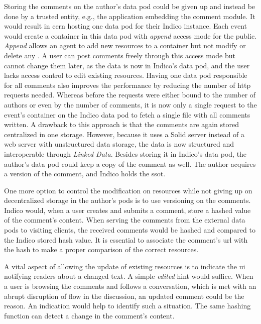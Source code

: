 Storing the comments on the author's data pod could be given up and instead be done by a trusted entity, e.g., the application embedding the comment module. It would result in \gls{cern} hosting one data pod for their Indico instance. Each event would create a container in this data pod with \textit{append} access mode for the public. \textit{Append} allows an agent to add new resources to a container but not modify or delete any \cite{solid-protocol}. A user can post comments freely through this access mode but cannot change them later, as the data is now in Indico's data pod, and the user lacks access control to edit existing resources. Having one data pod responsible for all comments also improves the performance by reducing the number of \gls{http} requests needed. Whereas before the requests were either bound to the number of authors or even by the number of comments, it is now only a single request to the event's container on the Indico data pod to fetch a single file with all comments written. A drawback to this approach is that the comments are again stored centralized in one storage. However, because it uses a Solid server instead of a web server with unstructured data storage, the data is now structured and interoperable through \textit{Linked Data}. Besides storing it in Indico's data pod, the author's data pod could keep a copy of the comment as well. The author acquires a version of the comment, and Indico holds the \gls{ssot}.

One more option to control the modification on resources while not giving up on decentralized storage in the author's pods is to use versioning on the comments. Indico would, when a user creates and submits a comment, store a hashed value of the comment's content. When serving the comments from the external data pods to visiting clients, the received comments would be hashed and compared to the Indico stored hash value. It is essential to associate the comment's \gls{url} with the hash to make a proper comparison of the correct resources.

A vital aspect of allowing the update of existing resources is to indicate the \gls{ui} notifying readers about a changed text. A simple \textit{edited} hint would suffice. When a user is browsing the comments and follows a conversation, which is met with an abrupt disruption of flow in the discussion, an updated comment could be the reason. An indication would help to identify such a situation. The same hashing function can detect a change in the comment's content.
\vspace{0.5cm}
